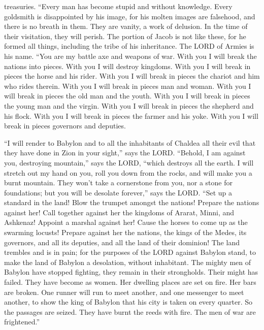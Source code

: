 treasuries.  ``Every man has become stupid and without
knowledge. Every goldsmith is disappointed by his image, for his molten
images are falsehood, and there is no breath in them. 
They are vanity, a work of delusion. In the time of their visitation,
they will perish.  The portion of Jacob is not like
these, for he formed all things, including the tribe of his inheritance.
The LORD of Armies is his name.  ``You are my battle axe
and weapons of war. With you I will break the nations into pieces. With
you I will destroy kingdoms.  With you I will break in
pieces the horse and his rider.  With you I will break in
pieces the chariot and him who rides therein. With you I will break in
pieces man and woman. With you I will break in pieces the old man and
the youth. With you I will break in pieces the young man and the virgin.
 With you I will break in pieces the shepherd and his
flock. With you I will break in pieces the farmer and his yoke. With you
I will break in pieces governors and deputies.

 ``I will render to Babylon and to all the inhabitants of
Chaldea all their evil that they have done in Zion in your sight,'' says
the LORD.  ``Behold, I am against you, destroying
mountain,'' says the LORD, ``which destroys all the earth. I will
stretch out my hand on you, roll you down from the rocks, and will make
you a burnt mountain.  They won't take a cornerstone from
you, nor a stone for foundations; but you will be desolate forever,''
says the LORD.  ``Set up a standard in the land! Blow the
trumpet amongst the nations! Prepare the nations against her! Call
together against her the kingdoms of Ararat, Minni, and Ashkenaz!
Appoint a marshal against her! Cause the horses to come up as the
swarming locusts!  Prepare against her the nations, the
kings of the Medes, its governors, and all its deputies, and all the
land of their dominion!  The land trembles and is in
pain; for the purposes of the LORD against Babylon stand, to make the
land of Babylon a desolation, without inhabitant.  The
mighty men of Babylon have stopped fighting, they remain in their
strongholds. Their might has failed. They have become as women. Her
dwelling places are set on fire. Her bars are broken. 
One runner will run to meet another, and one messenger to meet another,
to show the king of Babylon that his city is taken on every quarter.
 So the passages are seized. They have burnt the reeds
with fire. The men of war are frightened.''

